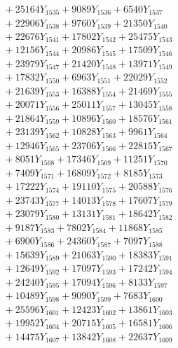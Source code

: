 \documentclass[a4paper,10pt]{article}
\begin{document}
{\begin{align}
&\;  + 25164 Y_{1535} + 9089 Y_{1536} + 6540 Y_{1537} \\[0.3ex]
&\;  + 22906 Y_{1538} + 9760 Y_{1539} + 21350 Y_{1540} \\[0.3ex]
&\;  + 22676 Y_{1541} + 17802 Y_{1542} + 25475 Y_{1543} \\[0.3ex]
&\;  + 12156 Y_{1544} + 20986 Y_{1545} + 17509 Y_{1546} \\[0.3ex]
&\;  + 23979 Y_{1547} + 21420 Y_{1548} + 13971 Y_{1549} \\[0.3ex]
&\;  + 17832 Y_{1550} + 6963 Y_{1551} + 22029 Y_{1552} \\[0.3ex]
&\;  + 21639 Y_{1553} + 16388 Y_{1554} + 21469 Y_{1555} \\[0.3ex]
&\;  + 20071 Y_{1556} + 25011 Y_{1557} + 13045 Y_{1558} \\[0.5ex]\allowbreak
&\;  + 21864 Y_{1559} + 10896 Y_{1560} + 18576 Y_{1561} \\[0.3ex]
&\;  + 23139 Y_{1562} + 10828 Y_{1563} + 9961 Y_{1564} \\[0.3ex]
&\;  + 12946 Y_{1565} + 23706 Y_{1566} + 22815 Y_{1567} \\[0.3ex]
&\;  + 8051 Y_{1568} + 17346 Y_{1569} + 11251 Y_{1570} \\[0.3ex]
&\;  + 7409 Y_{1571} + 16809 Y_{1572} + 8185 Y_{1573} \\[0.3ex]
&\;  + 17222 Y_{1574} + 19110 Y_{1575} + 20588 Y_{1576} \\[0.3ex]
&\;  + 23743 Y_{1577} + 14013 Y_{1578} + 17607 Y_{1579} \\[0.3ex]
&\;  + 23079 Y_{1580} + 13131 Y_{1581} + 18642 Y_{1582} \\[0.3ex]
&\;  + 9187 Y_{1583} + 7802 Y_{1584} + 11868 Y_{1585} \\[0.3ex]
&\;  + 6900 Y_{1586} + 24360 Y_{1587} + 7097 Y_{1588} \\[0.5ex]\allowbreak
&\;  + 15639 Y_{1589} + 21063 Y_{1590} + 18383 Y_{1591} \\[0.3ex]
&\;  + 12649 Y_{1592} + 17097 Y_{1593} + 17242 Y_{1594} \\[0.3ex]
&\;  + 24240 Y_{1595} + 17094 Y_{1596} + 8133 Y_{1597} \\[0.3ex]
&\;  + 10489 Y_{1598} + 9090 Y_{1599} + 7683 Y_{1600} \\[0.3ex]
&\;  + 25596 Y_{1601} + 12423 Y_{1602} + 13861 Y_{1603} \\[0.3ex]
&\;  + 19952 Y_{1604} + 20715 Y_{1605} + 16581 Y_{1606} \\[0.3ex]
&\;  + 14475 Y_{1607} + 13842 Y_{1608} + 22637 Y_{1609} \\[0.3ex]

\end{align}}
\end{document}
